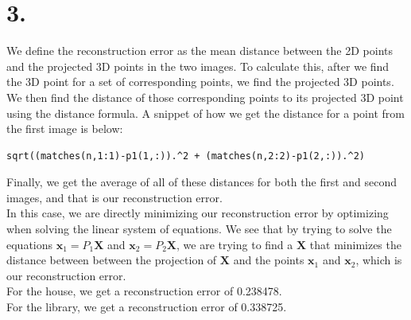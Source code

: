 \documentclass[11pt]{article}
\begin{document}
\section*{3.} We define the reconstruction error as the mean distance between the 2D points and the projected 3D points in the two images. To calculate this, after we find the 3D point for a set of corresponding points, we find the projected 3D points. We then find the distance of those corresponding points to its projected 3D point using the distance formula. A snippet of how we get the distance for a point from the first image is below:
\begin{verbatim}
sqrt((matches(n,1:1)-p1(1,:)).^2 + (matches(n,2:2)-p1(2,:)).^2)
\end{verbatim}
Finally, we get the average of all of these distances for both the first and second images, and that is our reconstruction error. \\
In this case, we are directly minimizing our reconstruction error by optimizing when solving the linear system of equations. We see that by trying to solve the equations $\textbf{x}_1 = P_1\textbf{X}$ and  $\textbf{x}_2 = P_2\textbf{X}$, we are trying to find a $\textbf{X}$ that minimizes the distance between between the projection of $\textbf{X}$ and the points $\textbf{x}_1$ and $\textbf{x}_2$, which is our reconstruction error. \\
For the house, we get a reconstruction error of 0.238478.\\
For the library, we get a reconstruction error of 0.338725.
\end{document}

